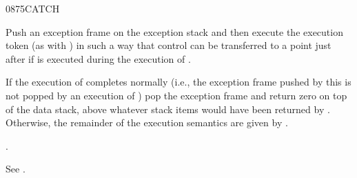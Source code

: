 \begin{worddef}{0875}{CATCH}
\item {}

	Push an exception frame on the exception stack and then execute
	the execution token  (as with ) in
	such a way that control can be transferred to a point just after
	 if  is executed during the execution of
	.

	If the execution of  completes normally (i.e., the
	exception frame pushed by this  is not popped by an
	execution of ) pop the exception frame and return
	zero on top of the data stack, above whatever stack items would
	have been returned by  . Otherwise,
	the remainder of the execution semantics are given by
	.

\see {}.

	\begin{testing}
		See .
	\end{testing}
\end{worddef}


